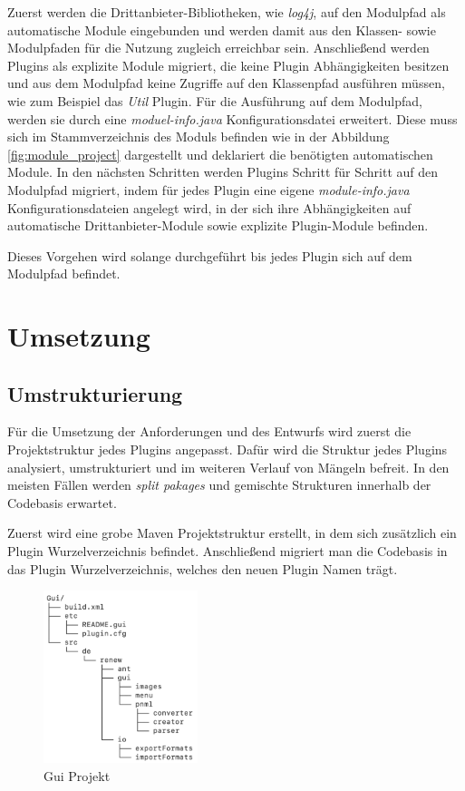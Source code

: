 	Zuerst werden die Drittanbieter-Bibliotheken, wie \textit{log4j}, auf den Modulpfad als automatische Module eingebunden und werden damit aus den Klassen- sowie Modulpfaden für die Nutzung zugleich erreichbar sein. Anschließend werden Plugins als explizite Module migriert, die keine Plugin Abhängigkeiten besitzen und aus dem Modulpfad keine Zugriffe auf den Klassenpfad ausführen müssen, wie zum Beispiel das \textit{Util} Plugin. Für die Ausführung auf dem Modulpfad, werden sie durch eine \textit{moduel-info.java} Konfigurationsdatei erweitert. Diese muss sich im Stammverzeichnis des Moduls befinden wie in der Abbildung \ref{fig:module_project} dargestellt und deklariert die benötigten automatischen Module. In den nächsten Schritten werden Plugins Schritt für Schritt auf den Modulpfad migriert, indem für jedes Plugin eine eigene \textit{module-info.java} Konfigurationsdateien angelegt wird, in der sich ihre Abhängigkeiten auf automatische Drittanbieter-Module sowie explizite Plugin-Module befinden.\bigbreak 

	Dieses Vorgehen wird solange durchgeführt bis jedes Plugin sich auf dem Modulpfad befindet. 


\section{Umsetzung}


\subsection{Umstrukturierung}

	Für die Umsetzung der Anforderungen und des Entwurfs wird zuerst die Projektstruktur jedes Plugins angepasst. Dafür wird die Struktur jedes Plugins analysiert, umstrukturiert und im weiteren Verlauf von Mängeln befreit. In den meisten Fällen werden \textit{split pakages} und gemischte Strukturen innerhalb der Codebasis erwartet.\bigbreak

	Zuerst wird eine grobe Maven Projektstruktur erstellt, in dem sich zusätzlich ein Plugin Wurzelverzeichnis befindet. Anschließend migriert man die Codebasis in das Plugin Wurzelverzeichnis, welches den neuen Plugin Namen trägt.

	\begin{figure}[h!]
	  \centering
	  \includegraphics[width=0.4\textwidth]{material/images/gui_struktur.png}
	  \caption{Gui Projekt}
	  \label{fig:gui}
	\end{figure}


